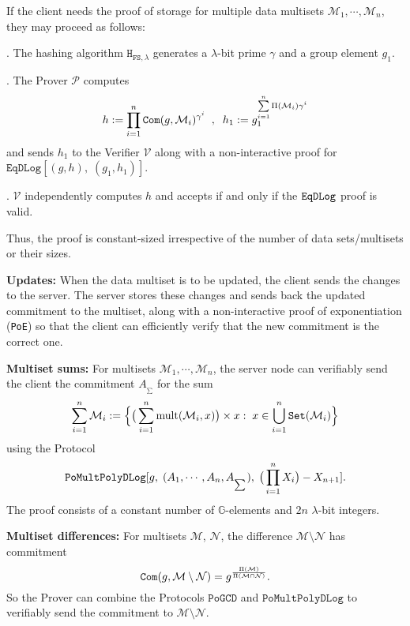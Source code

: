 \documentclass[11pt, lettersize, notitlepage, leqno, footskip=0.6cm]{article}
\newcommand{\pl}{\prod\limits}
\newcommand{\slim}{\sum\limits}
\newcommand{\ttt}{\texttt}
\newcommand{\sett}{\ttt{Set}}
\newcommand{\mul}{\mr{mult}}
\newcommand{\mc}{\mathcal}
\newcommand{\mb}{\mathbb}
\newcommand{\mr}{\mathrm}
\newcommand{\sm}{\setminus}
\newcommand{\lam}{\lambda}
\newcommand{\mP}{\mc{P}}
\newcommand{\V}{\mc{V}}
\newcommand{\mcM}{\mc{M}}
\newcommand{\vs}{\vspace{-0.15cm}}
\newcommand{\noin}{\noindent}
\numberwithin{equation}{section}
\begin{document}
If the client needs the proof of storage for multiple data multisets $\mc{M}_1,\cdots,\mc{M}_n$, they may proceed as follows: \vspace{0.1cm}

\noin 1. The hashing algorithm $\ttt{H}_{\ttt{FS},\lam}$ generates a $\lam$-bit prime $\gamma$ and a group element $g_1$.

\noin 2. The Prover $\mP$ computes \vs $$h:= \pl_{i=1}^n \ttt{Com}(g, \mcM_i)^{\gamma^i}\;\;,\;\;h_1:= g_1^{\slim_{i=1}^n \Pi(\mcM_i)\gamma^i}\vs $$ and sends $h_1$ to the Verifier $\V$ along with a non-interactive proof for $\ttt{EqDLog}[(g,h),\;(g_1,h_1)]$.

\noin 3. $\V$ independently computes $h$ and accepts if and only if the $\tt{EqDLog}$ proof is valid.\vspace{0.1cm}


\noin Thus, the proof is constant-sized irrespective of the number of data sets/multisets or their sizes.



\vspace{0.2cm}

\noin \textbf{Updates:} When the data multiset is to be updated, the client sends the changes to the server. The server stores these changes and sends back the updated commitment to the multiset, along with a non-interactive proof of exponentiation (\verb|PoE|) so that the client can efficiently verify that the new commitment is the correct one. \vspace{0.15cm}

\noin \textbf{Multiset sums:} For multisets $\mc{M}_1,\cdots,\mc{M}_n$, the server node can verifiably send the client the commitment $A_{_{\sum}}$ for the sum \vspace{-0.3cm}$$\sum\limits_{i=1}^n \mc{M}_i := \Big\{\big(\sum\limits_{i=1}^n \mul(\mc{M}_i, x)\big)\times x:\; x\in\bigcup\limits_{i=1}^n \sett(\mc{M}_i)\Big\} \vs $$ using the Protocol \vspace{-0.3cm} $$\ttt{PoMultPolyDLog}[g,\; (A_1,\cdots,A_n,A_{_{\sum}}),\;\big(\pl_{i=1}^{n}X_i\big)-X_{n+1}]. \vs $$ The proof consists of a constant number of $\mb{G}$-elements and $2n$ $\lam$-bit integers.

\bigskip

\noin \textbf{Multiset differences:} For multisets $\mc{M}$, $\mc{N}$, the difference $\mc{M}\sm \mc{N} $ has commitment \vs $$\protect{\verb|Com|}(g, \mc{M}\sm \mc{N}) = g^{\frac{\Pi(\mcM)}{\Pi(\mcM\cap \mc{N})}} .$$ So the Prover can combine the Protocols $\ttt{PoGCD}$ and $\ttt{PoMultPolyDLog}$ to verifiably send the commitment to $\mc{M}\sm \mc{N} $. 
\end{document}
